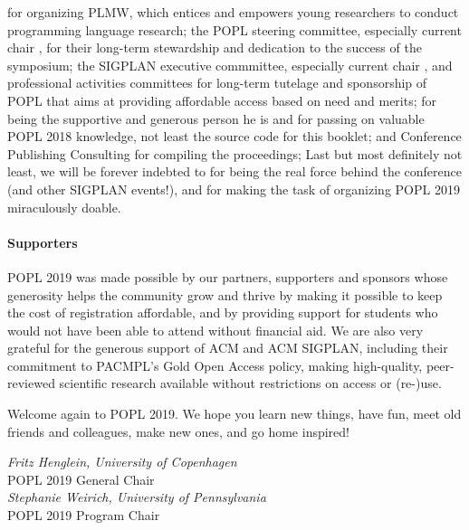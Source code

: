for organizing PLMW, which entices and empowers young researchers to conduct programming language research;
%
the POPL steering committee, especially current
chair , for their  
long-term stewardship and dedication to the success
of the symposium;
%
the SIGPLAN executive commmittee, especially current chair , and professional activities committees for long-term tutelage and sponsorship of POPL that aims at providing affordable access based on need and merits;
%
 for being the supportive and generous person he is
and  for passing on valuable POPL 2018 knowledge, not least the source code for this booklet;
%
%
%
%
 and Conference Publishing Consulting
for compiling the proceedings;
%
%
Last but most definitely not least, we will be forever indebted to
for being the real force behind the conference
(and other SIGPLAN events!), and for making the
task of organizing POPL 2019 miraculously doable.

\paragraph{Supporters}
%
POPL 2019 was made possible by our partners, supporters
and sponsors whose generosity helps the community grow
and thrive by making it possible to keep the cost of
registration affordable, and by providing support for
students who would not have been able to attend without
financial aid.
%
We are also very grateful for the generous support of
ACM and ACM SIGPLAN, including their commitment to
PACMPL's Gold Open Access policy, making high-quality,
peer-reviewed scientific research available without
restrictions on access or (re-)use.

\medskip
Welcome again to POPL 2019. We hope you learn new things,
have fun, meet old friends and colleagues, make new
ones, and go home inspired!

\begin{flushright}
\textit{Fritz Henglein, University of Copenhagen} \\
POPL 2019 General Chair
\medskip \\
\textit{Stephanie Weirich, University of Pennsylvania} \\
POPL 2019 Program Chair
\medskip \\
\end{flushright}




\newpage
